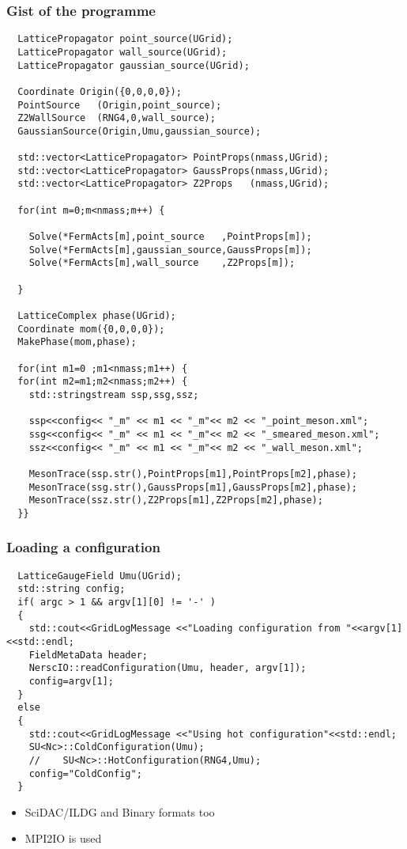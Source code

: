\documentclass[pdf,ps,8pt]{beamer}
\begin{document}
\begin{frame}[fragile]\small\frametitle{ Gist of the programme }
{\tiny
\begin{verbatim}
  LatticePropagator point_source(UGrid);
  LatticePropagator wall_source(UGrid);
  LatticePropagator gaussian_source(UGrid);

  Coordinate Origin({0,0,0,0});
  PointSource   (Origin,point_source);
  Z2WallSource  (RNG4,0,wall_source);
  GaussianSource(Origin,Umu,gaussian_source);
  
  std::vector<LatticePropagator> PointProps(nmass,UGrid);
  std::vector<LatticePropagator> GaussProps(nmass,UGrid);
  std::vector<LatticePropagator> Z2Props   (nmass,UGrid);

  for(int m=0;m<nmass;m++) {
    
    Solve(*FermActs[m],point_source   ,PointProps[m]);
    Solve(*FermActs[m],gaussian_source,GaussProps[m]);
    Solve(*FermActs[m],wall_source    ,Z2Props[m]);
  
  }

  LatticeComplex phase(UGrid);
  Coordinate mom({0,0,0,0});
  MakePhase(mom,phase);
  
  for(int m1=0 ;m1<nmass;m1++) {
  for(int m2=m1;m2<nmass;m2++) {
    std::stringstream ssp,ssg,ssz;

    ssp<<config<< "_m" << m1 << "_m"<< m2 << "_point_meson.xml";
    ssg<<config<< "_m" << m1 << "_m"<< m2 << "_smeared_meson.xml";
    ssz<<config<< "_m" << m1 << "_m"<< m2 << "_wall_meson.xml";

    MesonTrace(ssp.str(),PointProps[m1],PointProps[m2],phase);
    MesonTrace(ssg.str(),GaussProps[m1],GaussProps[m2],phase);
    MesonTrace(ssz.str(),Z2Props[m1],Z2Props[m2],phase);
  }}
\end{verbatim}
}  
\end{frame}

\begin{frame}[fragile]\small\frametitle{Loading a configuration}
  
{\tiny
\begin{verbatim}
  LatticeGaugeField Umu(UGrid);
  std::string config;
  if( argc > 1 && argv[1][0] != '-' )
  {
    std::cout<<GridLogMessage <<"Loading configuration from "<<argv[1]<<std::endl;
    FieldMetaData header;
    NerscIO::readConfiguration(Umu, header, argv[1]);
    config=argv[1];
  }
  else
  {
    std::cout<<GridLogMessage <<"Using hot configuration"<<std::endl;
    SU<Nc>::ColdConfiguration(Umu);
    //    SU<Nc>::HotConfiguration(RNG4,Umu);
    config="ColdConfig";
  }
\end{verbatim}
}
\begin{itemize}
  \item SciDAC/ILDG and Binary formats too
  \item MPI2IO is used
  \end{itemize}
\end{frame}
\end{document}
